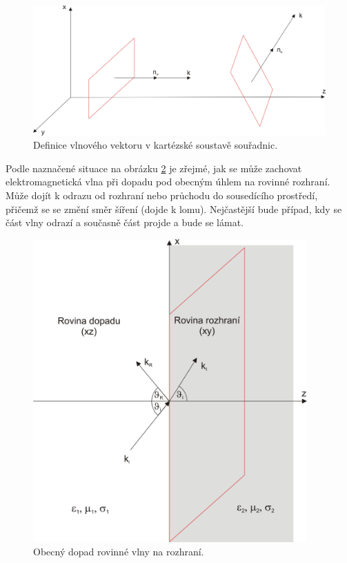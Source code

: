 \begin{figure}[!h]
	\centering
	\includegraphics[width=12cm]{evlny_vlnovy_vektor.png}
	\caption{Definice vlnového vektoru v kartézské soustavě souřadnic.\cite{emp}}
	\label{obr:evlny_vlnovy_vektor}
\end{figure}

Podle naznačené situace na obrázku \ref{obr:evlny_rovinne_rozhrani} je zřejmé, jak se může zachovat elektromagnetická vlna při dopadu pod obecným úhlem na rovinné rozhraní. Může dojít k odrazu od rozhraní nebo průchodu do sousedícího prostředí, přičemž se se změní směr šíření (dojde k lomu). Nejčastější bude případ, kdy se část vlny odrazí a současně část projde a bude se lámat. 

\begin{figure}[!h]
	\centering
	\includegraphics[width=10.5cm]{evlny_rovinne_rozhrani.png}
	\caption{Obecný dopad rovinné vlny na rozhraní.}
	\label{obr:evlny_rovinne_rozhrani}
\end{figure}

